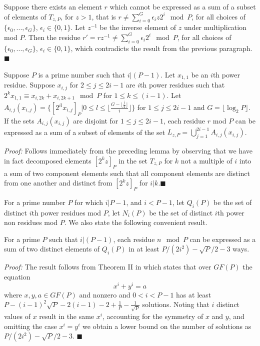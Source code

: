 Suppose there exists an element $r$ which cannot be expressed as a
sum of a subset of elements of $T_{z,P}$, for $z>1$, that is $r
\neq \sum_{i=0}^G \epsilon_i z 2^i \mod P$, for all choices of
$\{\epsilon_0,...,\epsilon_G\}$, $\epsilon_i \in \{0,1\}$. Let
$z^{-1}$ be the inverse element of $z$ under multiplication mod
$P$. Then the residue $r' = rz^{-1} \neq \sum_{i=0}^G \epsilon_i
2^i \mod P$, for all choices of $\{\epsilon_0,...,\epsilon_G\}$,
$\epsilon_i \in \{0,1\}$, which contradicts the result from the
previous paragraph.\hfill$\blacksquare$

\begin{lemma}\label{generates1} Suppose $P$ is a prime number such that $i|(P-1)$.
Let $x_{1,1}$ be an $i$th power residue. Suppose $x_{i,j}$ for $2
\leq j \leq 2i-1$ are $i$th power residues such that $2^{k}x_{1,1}
\equiv x_{i,2k}+x_{i,2k+1} \mod P$ for $1 \leq k \leq(i-1)$. Let
$A_{i,j}(x_{i,j}) =\{[2^{il}x_{i,j}]_P| 0 \leq l \leq \lfloor
\frac{G-\lfloor \frac{j}{2}\rfloor}{i}\rfloor\}$ for $1 \leq j \leq
2i-1$ and $G=\lfloor \log_2P \rfloor$. If the sets
$A_{i,j}(x_{i,j})$ are disjoint for $1 \leq j \leq 2i-1$, each
residue $r$ mod $P$ can be expressed as a sum of a subset of
elements of the set $L_{z,P}= \bigcup_{j=1}^{2i-1}
A_{i,j}(x_{i,j})$.
\end{lemma}
\noindent \textit{Proof:} Follows immediately from the preceding
lemma by observing that we have in fact decomposed elements
$[2^{k}z]_P$ in the set $T_{z,P}$ for $k$ not a multiple of $i$
into a sum of two component elements such that all component
elements are distinct from one another and distinct from
$[2^kz]_P$ for $i|k$.\hfill$\blacksquare$


For a prime number $P$ for which $i|P-1$, and $i<P-1$, let
$Q_i(P)$ be the set of distinct $i$th power residues mod $P$, let
$N_i(P)$ be the set of distinct $i$th power non residues mod $P$.
We also state the following convenient result.
\begin{lemma}\label{sums1}
For a prime $P$ such that $i | (P-1)$, each residue $n \mod P$ can
be expressed as a sum of two distinct elements of $Q_i(P)$ in at
least $P/(2i^2)-\sqrt{P}/2-3$ ways.
\end{lemma}
\noindent \textit{Proof:} The result follows from Theorem II in
\cite{huavan:49} which states that over $GF(P)$ the equation
\begin{equation}\label{hua} x^i+y^i=a
\end{equation} where $x,y,a \in GF(P)$ and nonzero and $0 < i <P-1 $
has at least
$P-(i-1)^2\sqrt{P}-2(i-1)-2+\frac{1}{P}-\frac{1}{\sqrt{P}}$
solutions. Noting that $i$ distinct values of $x$ result in the
same $x^i$, accounting for the symmetry of $x$ and $y$, and
omitting the case $x^i=y^i$ we obtain a lower bound on the number
of solutions as $P/(2i^2)-\sqrt{P}/2-3$. \hfill$\blacksquare$

